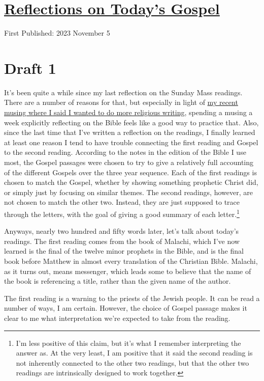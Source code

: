 \documentclass[12pt]{article}[titlepage]
\newcommand{\1}{\={a}}
\newcommand{\2}{\={e}}
\newcommand{\3}{\={\i}}
\newcommand{\4}{\=o}
\newcommand{\5}{\=u}
\newcommand{\6}{\={A}}
\renewcommand{\,}{\textsuperscript{,}}
\begin{document}
\doublespacing
\section{\href{reflections-on-readings-31-ordinary-a-23.html}{Reflections on Today's Gospel}}
First Published: 2023 November 5


\section{Draft 1}
It's been quite a while since my last reflection on the Sunday Mass readings.
There are a number of reasons for that, but especially in light of \href{christian-writing.html}{my recent musing where I said I wanted to do more religious writing,} spending a musing a week explicitly reflecting on the Bible feels like a good way to practice that.
Also, since the last time that I've written a reflection on the readings, I finally learned at least one reason I tend to have trouble connecting the first reading and Gospel to the second reading.
According to the notes in the edition of the Bible I use most, the Gospel passages were chosen to try to give a relatively full accounting of the different Gospels over the three year sequence.
Each of the first readings is chosen to match the Gospel, whether by showing something prophetic Christ did, or simply just by focusing on similar themes.
The second readings, however, are not chosen to match the other two.
Instead, they are just supposed to trace through the letters, with the goal of giving a good summary of each letter.\footnote{I'm less positive of this claim, but it's what I remember interpreting the answer as.
At the very least, I am positive that it said the second reading is not inherently connected to the other two readings, but that the other two readings are intrinsically designed to work together.}

Anyways, nearly two hundred and fifty words later, let's talk about today's readings.
The first reading comes from the book of Malachi, which I've now learned is the final of the twelve minor prophets in the Bible, and is the final book before Matthew in almost every translation of the Christian Bible.
Malachi, as it turns out, means messenger, which leads some to believe that the name of the book is referencing a title, rather than the given name of the author.

The first reading is a warning to the priests of the Jewish people.
It can be read a number of ways, I am certain.
However, the choice of Gospel passage makes it clear to me what interpretation we're expected to take from the reading.
\end{document}
